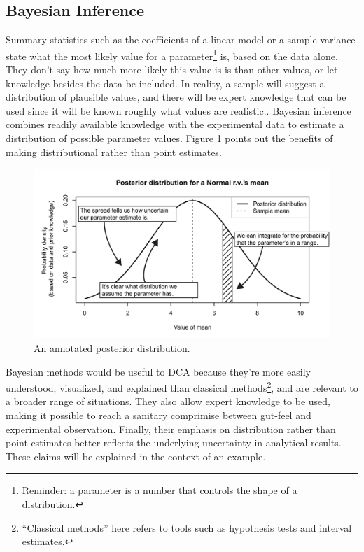 \documentclass[11pt,a4paper,article]{memoir} %
\begin{document}
\subsection*{Bayesian Inference}
Summary statistics such as the coefficients of a linear model or a sample variance state what the most likely value for a parameter\footnote{Reminder: a parameter is a number that controls the shape of a distribution.} is, based on the data alone. They don't say how much more likely this value is is than other values, or let knowledge besides the data be included. In reality, a sample will suggest a distribution of plausible values, and there will be expert knowledge that can be used since it will be known roughly what values are realistic.. Bayesian inference combines readily available knowledge with the experimental data to estimate a distribution of possible parameter values. Figure \ref{fig:annotated_posterior} points out the benefits of making distributional rather than point estimates.
\begin{figure}[b]
\includegraphics[width=\textwidth]{annotated_posterior.pdf}
\caption{An annotated posterior distribution.}
\label{fig:annotated_posterior}
\end{figure}
\par
Bayesian methods would be useful to DCA because they're more easily understood, visualized, and explained than classical methods\footnote{``Classical methods'' here refers to tools such as hypothesis tests and interval estimates.}, and are relevant to a broader range of situations. They also allow expert knowledge to be used, making it possible to reach a sanitary comprimise between gut-feel and experimental observation. Finally, their emphasis on distribution rather than point estimates better reflects the underlying uncertainty in analytical results. These claims will  be explained in the context of an example.
\end{document}

